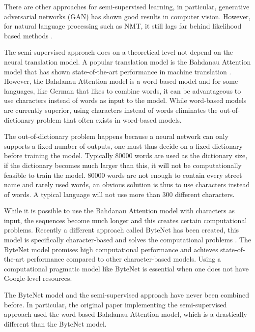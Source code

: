 There are other approaches for semi-supervised learning, in particular, generative adversarial networks (GAN) has shown good results in computer vision. However, for natural language processing such as NMT, it still lags far behind likelihood based methods \cite{gan-on-nlp}.

The semi-supervised approach does on a theoretical level not depend on the neural translation model. A popular translation model is the Bahdanau Attention model that has shown state-of-the-art performance in machine translation \cite{bahdanau-2015-nmt}. However, the Bahdanau Attention model is a word-based model and for some languages, like German that likes to combine words, it can be advantageous to use characters instead of words as input to the model. While word-based models are currently superior, using characters instead of words eliminates the out-of-dictionary problem that often exists in word-based models.

The out-of-dictionary problem happens because a neural network can only supports a fixed number of outputs, one must thus decide on a fixed dictionary before training the model. Typically 80000 words are used as the dictionary size, if the dictionary becomes much larger than this, it will not be computationally feasible to train the model. 80000 words are not enough to contain every street name and rarely used words, an obvious solution is thus to use characters instead of words. A typical language will not use more than 300 different characters.

While it is possible to use the Bahdanau Attention model with characters as input, the sequences become much longer and this creates certain computational problems. Recently a different approach called ByteNet has been created, this model is specifically character-based and solves the computational problems \cite{bytenet}. The ByteNet model promises high computational performance and achieves state-of-the-art performance compared to other character-based models. Using a computational pragmatic model like ByteNet is essential when one does not have Google-level resources.

The ByteNet model and the semi-supervised approach have never been combined before. In particular, the original paper implementing the semi-supervised approach used the word-based Bahdanau Attention model, which is a drastically different than the ByteNet model.


